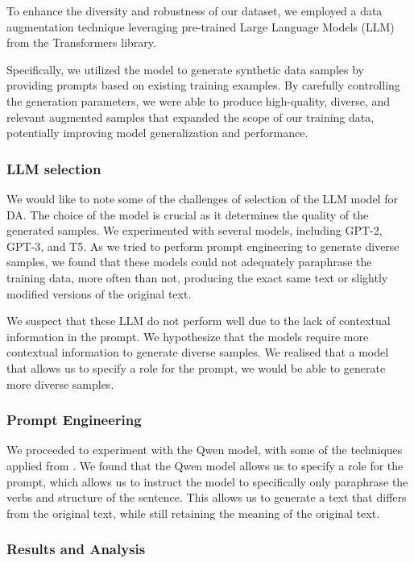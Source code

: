 \documentclass{article}
\begin{document}
To enhance the diversity and robustness of our dataset, we employed a data
augmentation technique leveraging pre-trained Large Language Models (LLM) from
the Transformers library.

Specifically, we utilized the model to generate synthetic data samples by
providing prompts based on existing training examples. By carefully controlling
the generation parameters, we were able to produce high-quality, diverse, and
relevant augmented samples that expanded the scope of our training data,
potentially improving model generalization and performance.

\subsubsection{LLM selection}

We would like to note some of the challenges of selection of the LLM model for
DA. The choice of the model is crucial as it determines the quality of the
generated samples. We experimented with several models, including GPT-2, GPT-3,
and T5. As we tried to perform prompt engineering to generate diverse samples,
we found that these models could not adequately paraphrase the training data,
more often than not, producing the exact same text or slightly modified
versions of the original text.

We suspect that these LLM do not perform well due to the lack of contextual
information in the prompt. We hypothesize that the models require more
contextual information to generate diverse samples. We realised that a model
that allows us to specify a role for the prompt, we would be able to generate
more diverse samples.

\subsubsection{Prompt Engineering}

We proceeded to experiment with the Qwen model, with some of the techniques
applied from \cite{promptingguide}. We found that the Qwen model allows us to
specify a role for the prompt, which allows us to instruct the model to
specifically only paraphrase the verbs and structure of the sentence. This
allows us to generate a text that differs from the original text, while still
retaining the meaning of the original text.

\subsubsection{Results and Analysis}
\end{document}
